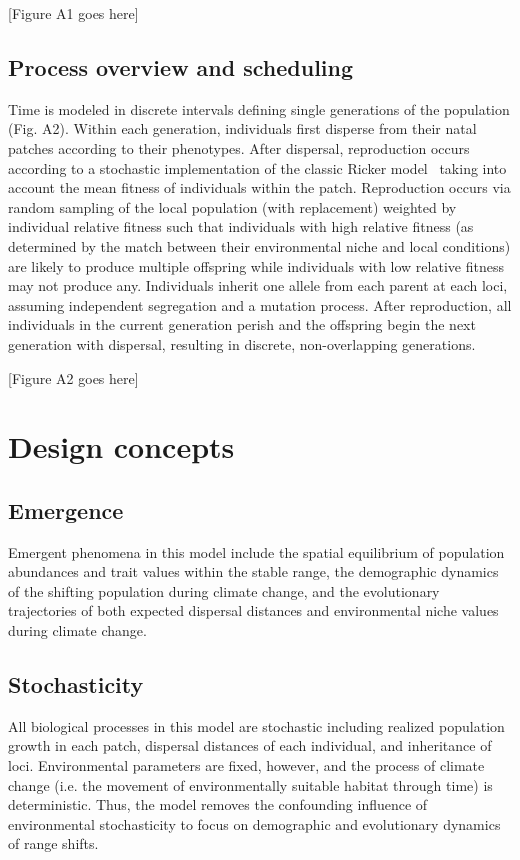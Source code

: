 \documentclass[11pt]{article}
\begin{document}
[Figure A1 goes here]

\subsection*{Process overview and scheduling} 
Time is modeled in discrete intervals defining single generations of the population (Fig. A2). Within each generation, individuals first disperse from their natal patches according to their phenotypes. After dispersal, reproduction occurs according to a stochastic implementation of the classic Ricker model~\citep{ricker1954stock} taking into account the mean fitness of individuals within the patch. Reproduction occurs via random sampling of the local population (with replacement) weighted by individual relative fitness such that individuals with high relative fitness (as determined by the match between their environmental niche and local conditions) are likely to produce multiple offspring while individuals with low relative fitness may not produce any. Individuals inherit one allele from each parent at each loci, assuming independent segregation and a mutation process. After reproduction, all individuals in the current generation perish and the offspring begin the next generation with dispersal, resulting in discrete, non-overlapping generations. 

[Figure A2 goes here]

\section*{Design concepts}
\subsection*{Emergence} 
Emergent phenomena in this model include the spatial equilibrium of population abundances and trait values within the stable range, the demographic dynamics of the shifting population during climate change, and the evolutionary trajectories of both expected dispersal distances and environmental niche values during climate change.

\subsection*{Stochasticity} 
All biological processes in this model are stochastic including realized population growth in each patch, dispersal distances of each individual, and inheritance of loci. Environmental parameters are fixed, however, and the process of climate change (i.e. the movement of environmentally suitable habitat through time) is deterministic. Thus, the model removes the confounding influence of environmental stochasticity to focus on demographic and evolutionary dynamics of range shifts.
\end{document}
